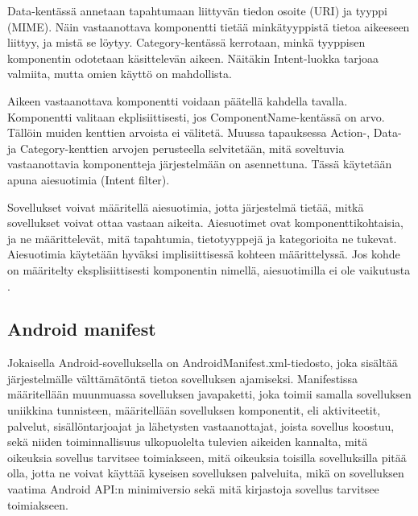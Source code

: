 Data-kentässä annetaan tapahtumaan liittyvän tiedon osoite (URI) ja tyyppi (MIME). Näin vastaanottava komponentti tietää minkätyyppistä tietoa aikeeseen liittyy, ja mistä se löytyy. Category-kentässä kerrotaan, minkä tyyppisen komponentin odotetaan käsittelevän aikeen. Näitäkin Intent-luokka tarjoaa valmiita, mutta omien käyttö on mahdollista.

Aikeen vastaanottava komponentti voidaan päätellä kahdella tavalla. Komponentti valitaan ekplisiittisesti, jos ComponentName-kentässä on arvo. Tällöin muiden kenttien arvoista ei välitetä. Muussa tapauksessa Action-, Data- ja Category-kenttien arvojen perusteella selvitetään, mitä soveltuvia vastaanottavia komponentteja järjestelmään on asennettuna. Tässä käytetään apuna aiesuotimia (Intent filter).

Sovellukset voivat määritellä aiesuotimia, jotta järjestelmä tietää, mitkä sovellukset voivat ottaa vastaan aikeita. Aiesuotimet ovat komponenttikohtaisia, ja ne määrittelevät, mitä tapahtumia, tietotyyppejä ja kategorioita ne tukevat. Aiesuotimia käytetään hyväksi implisiittisessä kohteen määrittelyssä. Jos kohde on määritelty eksplisiittisesti komponentin nimellä, aiesuotimilla ei ole vaikutusta \cite{android}.

\subsection{Android manifest}

Jokaisella Android-sovelluksella on AndroidManifest.xml-tiedosto, joka sisältää järjestelmälle välttämätöntä tietoa sovelluksen ajamiseksi. Manifestissa määritellään muunmuassa sovelluksen javapaketti, joka toimii samalla sovelluksen uniikkina tunnisteen, määritellään sovelluksen komponentit, eli aktiviteetit, palvelut, sisällöntarjoajat ja lähetysten vastaanottajat, joista sovellus koostuu, sekä niiden toiminnallisuus ulkopuolelta tulevien aikeiden kannalta, mitä oikeuksia sovellus tarvitsee toimiakseen, mitä oikeuksia toisilla sovelluksilla pitää olla, jotta ne voivat käyttää kyseisen sovelluksen palveluita, mikä on sovelluksen vaatima Android API:n minimiversio sekä mitä kirjastoja sovellus tarvitsee toimiakseen. \cite{android}